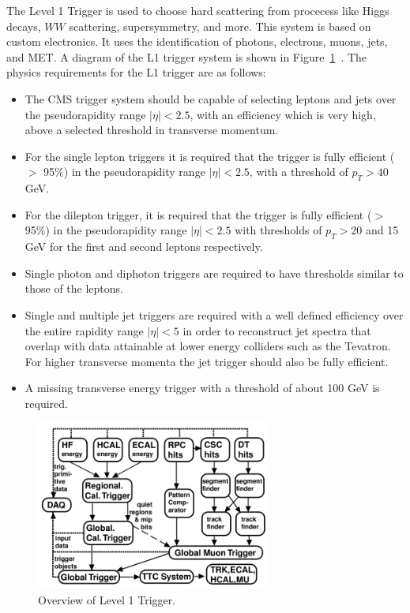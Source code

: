 The Level 1 Trigger is used to choose hard scattering from procecess like Higgs decays, $WW$ scattering, supersymmetry, and more.  This system is based on custom electronics.  It uses the identification of photons, electrons, muons, jets, and MET. A diagram of the L1 trigger system is shown in Figure~\ref{fig:l1triggeroverview}~\cite{Bayatyan:706847}. The physics requirements for the L1 trigger are as follows:~\cite{Bayatyan:706847}
\begin{itemize}
  \item
    The CMS trigger system should be capable of selecting leptons and jets over the pseudorapidity range $|\eta| < 2.5$, with an efficiency which is very high, above a selected threshold in transverse momentum.
  \item
    For the single lepton triggers it is required that the trigger is fully efficient ($>$ 95\%) in the pseudorapidity range $|\eta| < 2.5$, with a threshold of $p_T> 40$ GeV.
  \item
    For the dilepton trigger, it is required that the trigger is fully efficient ($>$ 95\%) in the pseudorapidity range $|\eta| < 2.5$ with thresholds of $p_T> 20$ and 15 GeV for the first and second leptons respectively.
  \item
    Single photon and diphoton triggers are required to have thresholds similar to those of the leptons.
  \item
    Single and multiple jet triggers are required with a well defined efficiency over the entire rapidity range $|\eta| < 5$ in order to reconstruct jet spectra that overlap with data attainable at lower energy colliders such as the Tevatron. For higher transverse momenta the jet trigger should also be fully efficient.
  \item
    A missing transverse energy trigger with a threshold of about 100 GeV is required.
\end{itemize}

\begin{figure}[htb]
\centering
\includegraphics[width=0.69\textwidth]{Experiment/l1trigger.pdf}
\caption{Overview of Level 1 Trigger.~\cite{Bayatyan:706847}}
\label{fig:l1triggeroverview}
\end{figure}

